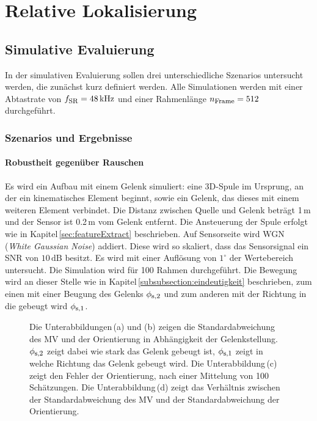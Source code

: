 \section{Relative Lokalisierung}
\label{sec:rel_lok}


\subsection{Simulative Evaluierung}
In der simulativen Evaluierung sollen drei unterschiedliche Szenarios untersucht werden, die zunächst kurz definiert werden. Alle Simulationen werden mit einer Abtastrate von $f_{\textrm{\footnotesize{SR}}}=48\,\text{kHz}$ und einer Rahmenlänge $n_{\textrm{\footnotesize{Frame}}} = 512$ durchgeführt.

\subsubsection{Szenarios und Ergebnisse}
\paragraph{Robustheit gegenüber Rauschen}
Es wird ein Aufbau mit einem Gelenk simuliert: eine 3D-Spule im Ursprung, an der ein kinematisches Element beginnt, sowie ein Gelenk, das dieses mit einem weiteren Element verbindet. Die Distanz zwischen Quelle und Gelenk beträgt 1\,m und der Sensor ist 0.2\,m vom Gelenk entfernt. Die Ansteuerung der Spule erfolgt wie in Kapitel\,\ref{sec:featureExtract} beschrieben. Auf Sensorseite wird WGN (\textit{White Gaussian Noise}) addiert. Diese wird so skaliert, dass das Sensorsignal ein SNR von $10\,\text{dB}$ besitzt. Es wird mit einer Auflösung von $1^\circ$ der Wertebereich untersucht. Die Simulation wird für 100 Rahmen durchgeführt. Die Bewegung wird an dieser Stelle wie in Kapitel\,\ref{subsubsection:eindeutigkeit} beschrieben, zum einen mit einer Beugung des Gelenks $\phi_{\textrm{\footnotesize{s,2}}}$ und zum anderen mit der Richtung in die gebeugt wird $\phi_{\textrm{\footnotesize{s,1}}}$.
\begin{figure}[h]
  \centering
  \vspace{0.1cm}
  \centering
  \caption{Die Unterabbildungen\,(a) und (b) zeigen die Standardabweichung des MV und der Orientierung in Abhängigkeit der Gelenkstellung. $\phi_{\textrm{\footnotesize{s,2}}}$ zeigt dabei wie stark das Gelenk gebeugt ist, $\phi_{\textrm{\footnotesize{s,1}}}$ zeigt in welche Richtung das Gelenk gebeugt wird.
  Die Unterabbildung\,(c) zeigt den Fehler der Orientierung, nach einer Mittelung von 100 Schätzungen. Die Unterabbildung\,(d) zeigt das Verhältnis zwischen der Standardabweichung des MV und der Standardabweichung der Orientierung.}
  \label{fig:Variance}
\end{figure}

